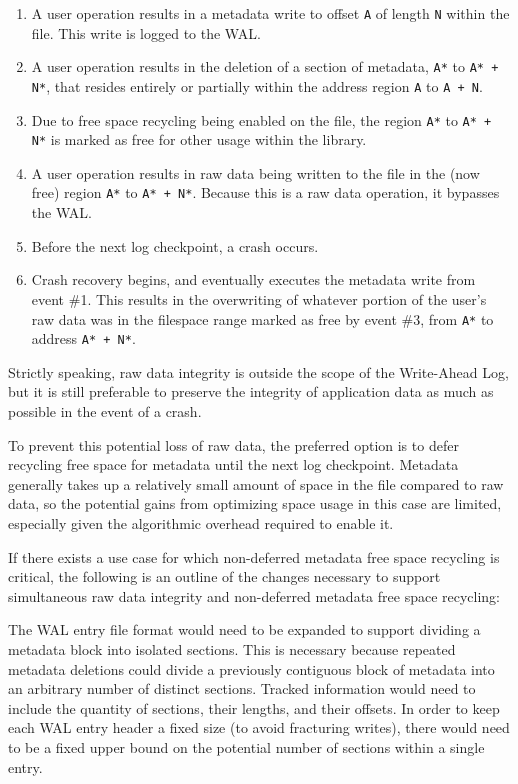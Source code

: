\begin{enumerate}
    \item A user operation results in a metadata write to offset \texttt{A} of length \texttt{N} within the file. This write is logged to the WAL.
    
    \item A user operation results in the deletion of a section of metadata, \texttt{A*} to \texttt{A* + N*}, that resides entirely or partially within the address region \texttt{A} to \texttt{A + N}. 
    
    \item Due to free space recycling being enabled on the file, the region \texttt{A*} to \texttt{A* + N*} is marked as free for other usage within the library.

    \item A user operation results in raw data being written to the file in the (now free) region \texttt{A*} to \texttt{A* + N*}. Because this is a raw data operation, it bypasses the WAL.

    \item Before the next log checkpoint, a crash occurs.

    \item Crash recovery begins, and eventually executes the metadata write from event \#1. This results in the overwriting of whatever portion of the user's raw data was in the filespace range marked as free by event \#3, from \texttt{A*} to address \texttt{A* + N*}.
\end{enumerate}

    Strictly speaking, raw data integrity is outside the scope of the Write-Ahead Log, but it is still preferable to preserve the integrity of application data as much as possible in the event of a crash. 

    To prevent this potential loss of raw data, the preferred option is to defer recycling free space for metadata until the next log checkpoint. Metadata generally takes up a relatively small amount of space in the file compared to raw data, so the potential gains from optimizing space usage in this case are limited, especially given the algorithmic overhead required to enable it.

    If there exists a use case for which non-deferred metadata free space recycling is critical, the following is an outline of the changes necessary to support simultaneous raw data integrity and non-deferred metadata free space recycling:

    The WAL entry file format would need to be expanded to support dividing a metadata block into isolated sections. This is necessary because repeated metadata deletions could divide a previously contiguous block of metadata into an arbitrary number of distinct sections. Tracked information would need to include the quantity of sections, their lengths, and their offsets. In order to keep each WAL entry header a fixed size (to avoid fracturing writes), there would need to be a fixed upper bound on the potential number of sections within a single entry. 

